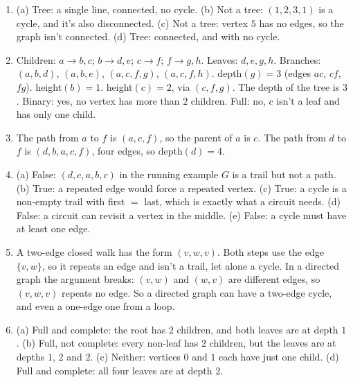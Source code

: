 \begin{enumerate}
\item (a) Tree: a single line, connected, no cycle. (b) Not a tree: $(1,2,3,1)$ is a cycle, and it's also disconnected. (c) Not a tree: vertex $5$ has no edges, so the graph isn't connected. (d) Tree: connected, and with no cycle.
\item Children: $a\to b,c$; $b\to d,e$; $c\to f$; $f\to g,h$. Leaves: $d,e,g,h$. Branches: $(a,b,d)$, $(a,b,e)$, $(a,c,f,g)$, $(a,c,f,h)$. depth$(g)=3$ (edges $ac$, $cf$, $fg$). height$(b)=1$. height$(c)=2$, via $(c,f,g)$. The depth of the tree is $3$. Binary: yes, no vertex has more than $2$ children. Full: no, $c$ isn't a leaf and has only one child.
\item The path from $a$ to $f$ is $(a,c,f)$, so the parent of $a$ is $c$. The path from $d$ to $f$ is $(d,b,a,c,f)$, four edges, so depth$(d)=4$.
\item (a) False: $(d,c,a,b,c)$ in the running example $G$ is a trail but not a path. (b) True: a repeated edge would force a repeated vertex. (c) True: a cycle is a non-empty trail with first $=$ last, which is exactly what a circuit needs. (d) False: a circuit can revisit a vertex in the middle. (e) False: a cycle must have at least one edge.
\item A two-edge closed walk has the form $(v,w,v)$. Both steps use the edge $\{v,w\}$, so it repeats an edge and isn't a trail, let alone a cycle. In a directed graph the argument breaks: $(v,w)$ and $(w,v)$ are different edges, so $(v,w,v)$ repeats no edge. So a directed graph can have a two-edge cycle, and even a one-edge one from a loop.
\item (a) Full and complete: the root has $2$ children, and both leaves are at depth $1$. (b) Full, not complete: every non-leaf has $2$ children, but the leaves are at depths $1$, $2$ and $2$. (c) Neither: vertices $0$ and $1$ each have just one child. (d) Full and complete: all four leaves are at depth $2$.
\end{enumerate}
